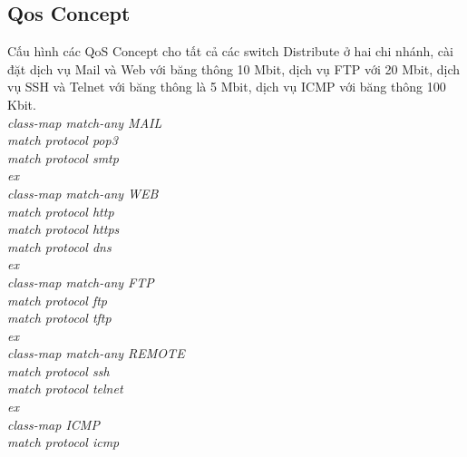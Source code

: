 \documentclass[a4paper, 12pt]{article}
\begin{document}
\subsection{Qos Concept}
\hspace*{1cm} Cấu hình các QoS Concept cho tất cả các switch Distribute ở hai chi nhánh, cài đặt dịch vụ Mail và Web với băng thông 10 Mbit, dịch vụ FTP với 20 Mbit, dịch vụ SSH và Telnet với băng thông là 5 Mbit, dịch vụ ICMP với băng thông 100 Kbit.\\
\hspace*{2cm}\textit{class-map match-any MAIL\\
\hspace*{2cm}match protocol pop3\\
\hspace*{2cm}match protocol smtp\\
\hspace*{2cm}ex\\
\hspace*{2cm}class-map match-any WEB\\
\hspace*{2cm}match protocol http\\
\hspace*{2cm}match protocol https\\
\hspace*{2cm}match protocol dns\\
\hspace*{2cm}ex\\
\hspace*{2cm}class-map match-any FTP\\
\hspace*{2cm}match protocol ftp\\
\hspace*{2cm}match protocol tftp\\
\hspace*{2cm}ex\\
\hspace*{2cm}class-map match-any REMOTE\\
\hspace*{2cm}match protocol ssh\\
\hspace*{2cm}match protocol telnet\\
\hspace*{2cm}ex\\
\hspace*{2cm}class-map ICMP\\
\hspace*{2cm}match protocol icmp\\
}
\end{document}
